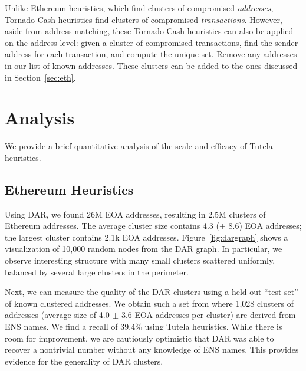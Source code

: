 \documentclass[11pt,a4paper]{article}
\begin{document}
Unlike Ethereum heuristics, which find clusters of compromised \textit{addresses}, Tornado Cash heuristics find clusters of compromised \textit{transactions}. However, aside from address matching, these Tornado Cash heuristics can also be applied on the address level: given a cluster of compromised transactions, find the sender address for each transaction, and compute the unique set. Remove any addresses in our list of known addresses. These clusters can be added to the ones discussed in Section~\ref{sec:eth}.

\section{Analysis}

We provide a brief quantitative analysis of the scale and efficacy of Tutela heuristics.

\subsection{Ethereum Heuristics}

Using DAR, we found 26M EOA addresses, resulting in 2.5M clusters of Ethereum addresses. The average cluster size contains 4.3 ($\pm$ 8.6) EOA addresses; the largest cluster contains 2.1k EOA addresses. Figure~\ref{fig:dargraph} shows a visualization of 10,000 random nodes from the DAR graph. In particular, we observe interesting structure with many small clusters scattered uniformly, balanced by several large clusters in the perimeter.

Next, we can measure the quality of the DAR clusters using a held out ``test set'' of known clustered addresses. We obtain such a set from \cite{beres2021blockchain} where 1,028 clusters of addresses (average size of 4.0 $\pm$ 3.6 EOA addresses per cluster) are derived from ENS names. We find a recall of 39.4\% using Tutela heuristics. While there is room for improvement, we are cautiously optimistic that DAR was able to recover a nontrivial number without any knowledge of ENS names. This provides evidence for the generality of DAR clusters.
\end{document}
